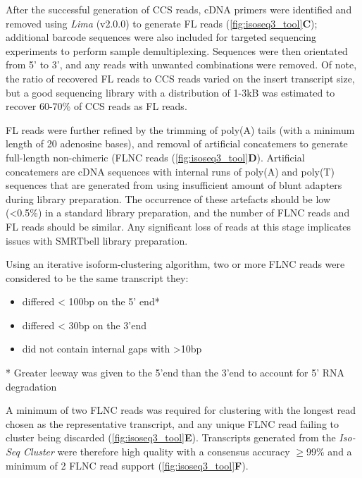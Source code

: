 After the successful generation of CCS reads, cDNA primers were identified and removed using \textit{Lima} (v2.0.0) to generate FL reads (\cref{fig:isoseq3_tool}\textbf{C}); additional barcode sequences were also included for targeted sequencing experiments to perform sample demultiplexing. Sequences were then orientated from 5’ to 3’, and any reads with unwanted combinations were removed. Of note, the ratio of recovered FL reads to CCS reads varied on the insert transcript size, but a good sequencing library with a distribution of 1-3kB was estimated to recover 60-70\% of CCS reads as FL reads.   

FL reads were further refined by the trimming of poly(A) tails (with a minimum length of 20 adenosine bases), and removal of artificial concatemers to generate full-length non-chimeric (FLNC reads (\cref{fig:isoseq3_tool}\textbf{D}). Artificial concatemers are cDNA sequences with internal runs of poly(A) and poly(T) sequences that are generated from using insufficient amount of blunt adapters during library preparation. The occurrence of these artefacts should be low (<0.5\%) in a standard library preparation, and the number of FLNC reads and FL reads should be similar. Any significant loss of reads at this stage implicates issues with SMRTbell library preparation.

Using an iterative isoform-clustering algorithm, two or more FLNC reads were considered to be the same transcript they: 
\begin{itemize}
	\item differed < 100bp on the 5’ end* 
	\item differed < 30bp on the 3’end 
	\item did not contain internal gaps with >10bp
\end{itemize}
* Greater leeway was given to the 5'end than the 3'end to account for 5' RNA degradation

A minimum of two FLNC reads was required for clustering with the longest read chosen as the representative transcript, and any unique FLNC read failing to cluster being discarded (\cref{fig:isoseq3_tool}\textbf{E}). Transcripts generated from the \textit{Iso-Seq Cluster} were therefore high quality with a consensus accuracy $\geq$99\% and a minimum of 2 FLNC read support (\cref{fig:isoseq3_tool}\textbf{F}). 


